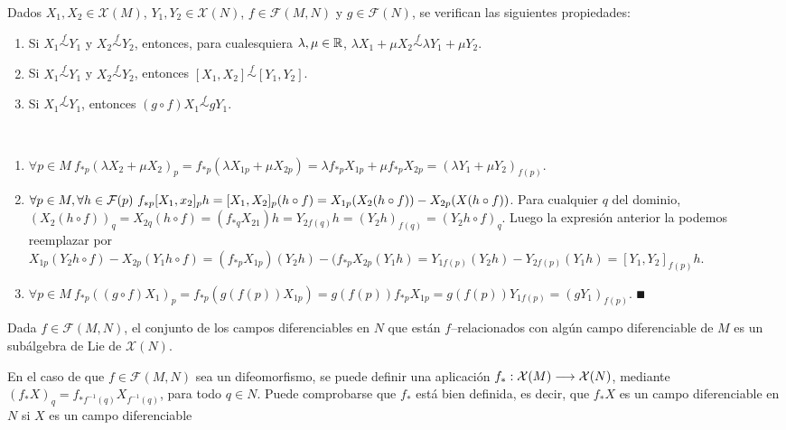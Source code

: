 \documentclass[Cursovd_portada.tex]{subfiles}
\begin{document}
\newpage

\begin{prop}
Dados $X_1,X_2\in\mathcal{X}(M)$, $Y_1,Y_2\in\mathcal{X}(N)$, $f\in\mathcal{F}(M,N)$ y $g\in\mathcal{F}(N)$, se
verifican las siguientes propiedades:
\begin{enumerate}
\item Si $X_1\stackrel{f}\sim Y_1$ y $X_2\stackrel{f}\sim Y_2$, entonces, para cualesquiera $\lambda,\mu\in\mathbb{R}$,
$\lambda X_1+\mu X_2\stackrel{f}\sim \lambda Y_1+\mu Y_2$.
\item Si $X_1\stackrel{f}\sim Y_1$ y $X_2\stackrel{f}\sim Y_2$, entonces $[X_1,X_2]\stackrel{f}\sim [Y_1,Y_2]$.
\item Si $X_1\stackrel{f}\sim Y_1$, entonces $(g\circ f)X_1\stackrel{f}\sim gY_1$.
\end{enumerate}
\end{prop}
\begin{dem}\
\begin{enumerate}
\item $\forall p\in M\ f_{*p}(\lambda X_2+\mu X_2)_p=f_{*p}(\lambda X_{1p}+\mu X_{2p})=\lambda f_{*p}X_{1p}+\mu f_{*p}X_{2p}=(\lambda Y_1 +\mu Y_2)_{f(p)}$.
\item $\forall p\in M,\forall h\in\calF(p)\ f_{*p}[X_1,x_2]_ph=[X_1,X_2]_p(h\circ f)=X_{1p}(X_2(h\circ f))-X_{2p}(X(h\circ f))$. Para cualquier $q$ del dominio, $(X_2(h\circ f))_q=X_{2q}(h\circ f)=(f_{*q}X_{21})h=Y_{2f(q)}h=(Y_2h)_{f(q)}=(Y_2h\circ f)_q$. Luego la expresión anterior la podemos reemplazar por $X_{1p}(Y_2h\circ f)-X_{2p}(Y_1h\circ f)=(f_{*p}X_{1p})(Y_2h)-(f_{*p}X_{2p}(Y_1h)=Y_{1f(p)}(Y_2h)-Y_{2f(p)}(Y_1h)=[Y_1,Y_2]_{f(p)}h.$
\item $\forall p\in M\ f_{*p}((g\circ f)X_1)_p=f_{*p}(g(f(p))X_{1p})=g(f(p))f_{*p}X_{1p}=g(f(p))Y_{1f(p)}=(gY_1)_{f(p)}$. $\QED$
\end{enumerate}
\end{dem}
\begin{coro}
Dada $f\in\mathcal{F}(M,N)$, el conjunto de los campos diferenciables en $N$ que están $f$--relacionados con algún
campo diferenciable de $M$ es un subálgebra de Lie de $\mathcal{X}(N)$.
\end{coro}
En el caso de que $f\in\mathcal{F}(M,N)$ sea un difeomorfismo, se
puede definir una aplicación
$f_*:\mathcal{X}(M)\longrightarrow\mathcal{X}(N)$, mediante
$(f_*X)_q=f_{*f^{-1}(q)}X_{f^{-1}(q)}$, para todo $q\in N$. Puede
comprobarse que $f_*$ está bien definida, es decir, que $f_*X$
es un campo diferenciable en $N$ si $X$ es un campo diferenciable
\end{document}
